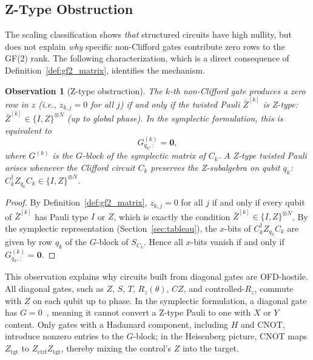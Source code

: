 \documentclass[a4paper,twocolumn,11pt]{quantumarticle}
\newtheorem{observation}[theorem]{Observation}
\begin{document}
\subsection{Z-Type Obstruction}
\label{sec:z_type}

The scaling classification shows \emph{that} structured circuits have high nullity, but does not explain \emph{why} specific non-Clifford gates contribute zero rows to the GF(2) rank.
The following characterization, which is a direct consequence of Definition~\ref{def:gf2_matrix}, identifies the mechanism.

\begin{observation}[Z-type obstruction]
\label{prop:z_type}
The $k$-th non-Clifford gate produces a zero row in $z$ (i.e., $z_{k,j} = 0$ for all $j$) if and only if the twisted Pauli $\bar{Z}^{[k]}$ is Z-type: $\bar{Z}^{[k]} \in \{I, Z\}^{\otimes N}$ (up to global phase).
In the symplectic formulation, this is equivalent to
\begin{equation}
G^{(k)}_{q_k,:} = \mathbf{0},
\end{equation}
where $G^{(k)}$ is the $G$-block of the symplectic matrix of $C_k$.
A Z-type twisted Pauli arises whenever the Clifford circuit $C_k$ preserves the Z-subalgebra on qubit $q_k$: $C_k^\dagger Z_{q_k} C_k \in \{I, Z\}^{\otimes N}$.
\end{observation}

\begin{proof}
By Definition~\ref{def:gf2_matrix}, $z_{k,j} = 0$ for all $j$ if and only if every qubit of $\bar{Z}^{[k]}$ has Pauli type $I$ or $Z$, which is exactly the condition $\bar{Z}^{[k]} \in \{I,Z\}^{\otimes N}$.
By the symplectic representation (Section~\ref{sec:tableau}), the $x$-bits of $C_k^\dagger Z_{q_k} C_k$ are given by row $q_k$ of the $G$-block of $S_{C_k}$.
Hence all $x$-bits vanish if and only if $G^{(k)}_{q_k,:} = \mathbf{0}$.
\end{proof}

This observation explains why circuits built from diagonal gates are OFD-hostile.
All diagonal gates, such as $Z$, $S$, $T$, $R_z(\theta)$, $CZ$, and controlled-$R_z$, commute with $Z$ on each qubit up to phase.
In the symplectic formulation, a diagonal gate has $G = 0$~\cite{Dehaene2003}, meaning it cannot convert a Z-type Pauli to one with $X$ or $Y$ content.
Only gates with a Hadamard component, including $H$ and CNOT, introduce nonzero entries to the $G$-block; in the Heisenberg picture, CNOT maps $Z_{\mathrm{tgt}}$ to $Z_{\mathrm{ctrl}} Z_{\mathrm{tgt}}$, thereby mixing the control's $Z$ into the target.
\end{document}
